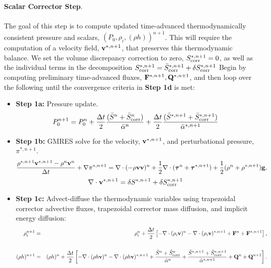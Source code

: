 \documentclass[final]{siamltex}
\def\Fb {{\bf F}}
\def\gb {{\bf g}}
\def\Qb {{\bf Q}}
\def\vb {{\bf v}}
\def\taub   {\boldsymbol{\tau}}
\begin{document}
{\bf Scalar Corrector Step}.\\ \\
The goal of this step is to compute updated time-advanced thermodynamically consistent 
pressure and scalars, $(P_0,\rho_i,(\rho h))^{n+1}$.  This will require the computation
of a velocity field, $\vb^{*,n+1}$, that preserves this thermodynamic balance.
We set the volume discrepancy correction to zero,
$S_{\rm corr}^{*,n+1} = 0$, as well as the individual terms in the decomposition
$S_{\rm corr}^{*,n+1} = \bar{S}_{\rm corr}^{*,n+1} + \delta S_{\rm corr}^{*,n+1}$
Begin by computing preliminary time-advanced fluxes, $\Fb^{*,n+1}, \Qb^{*,n+1}$,
and then loop over the following until the convergence criteria in {\bf Step 1d} is met:\\
\begin{itemize}
\item {\bf Step 1a:} Pressure update.
\begin{equation}
P_0^{n+1} = P_0^n + \frac{\Delta t}{2}\frac{(\bar{S}^n + \bar{S}_{\rm corr}^n)}{\bar{\alpha}^n} + \frac{\Delta t}{2}\frac{(\bar{S}^{*,n+1} + \bar{S}_{\rm corr}^{*,n+1})}{\bar{\alpha}^{*,n+1}}
\end{equation}
\item {\bf Step 1b:} GMRES solve for the velocity, $\vb^{*,n+1}$, and perturbational
pressure, $\pi^{*,n+1}$.
\begin{equation}
\frac{\rho^{*,n+1}\vb^{*,n+1} - \rho^n\vb^n}{\Delta t} + \nabla\pi^{*,n+1} = \nabla\cdot(-\rho\vb\vb)^n + \frac{1}{2}\nabla\cdot(\taub^n + \taub^{*,n+1}) + \frac{1}{2}(\rho^n + \rho^{*,n+1})\gb,
\end{equation}
\begin{equation}
\nabla\cdot\vb^{*,n+1} = \delta S^{*,n+1} + \delta S_{\rm corr}^{*,n+1}
\end{equation}
\item {\bf Step 1c:} Advect-diffuse the thermodynamic variables using trapezoidal 
corrector advective fluxes, trapezoidal corrector mass diffusion, and implicit energy 
diffusion:
\begin{eqnarray}
\rho_i^{n+1} &=& \rho_i^n + \frac{\Delta t}{2}\left[-\nabla\cdot(\rho_i\vb)^n -\nabla\cdot(\rho_i\vb)^{*,n+1} + \Fb^n + \Fb^{*,n+1}\right],\nonumber \\
\\
(\rho h)^{n+1} &=& (\rho h)^n + \frac{\Delta t}{2}\left[-\nabla\cdot(\rho h\vb)^n -\nabla\cdot(\rho h\vb)^{*,n+1} + \frac{\bar{S}^n + \bar{S}_{\rm corr}^n}{\bar{\alpha}^n} + \frac{\bar{S}^{*,n+1}+ \bar{S}_{\rm corr}^{*,n+1}}{\bar{\alpha}^{*,n+1}} + \Qb^n + \Qb^{n+1}\right].\nonumber\\

\end{eqnarray}
\end{itemize}
\end{document}
